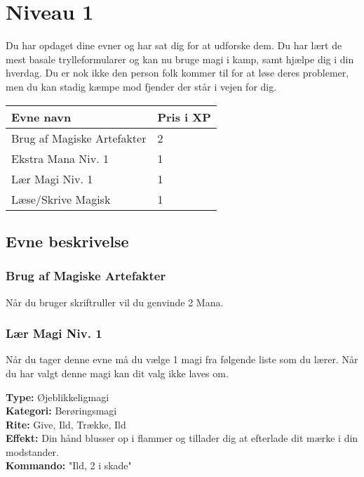 \chapter{Niveau 1}
Du har opdaget dine evner og har sat dig for at udforske dem. Du har lært de mest basale trylleformularer og kan nu bruge magi i kamp, samt hjælpe dig i din hverdag. Du er nok ikke den person folk kommer til for at løse deres problemer, men du kan stadig kæmpe mod fjender der står i vejen for dig.
\begin{table}[H]
    \centering
    \begin{tabular}{|p{}|p{}|}
    \rowcolor{cerulean!80}\hline
        Evne navn & Pris i XP \\\hline
         Brug af Magiske Artefakter & 2 \\\hline
         Ekstra Mana Niv. 1 & 1 \\\hline
         Lær Magi Niv. 1 & 1 \\\hline
         Læse/Skrive Magisk & 1 \\\hline
    \end{tabular}
\end{table} 

\section{Evne beskrivelse}

\subsection{Brug af Magiske Artefakter}
Når du bruger skriftruller vil du genvinde 2 Mana. 



\subsection{Lær Magi Niv. 1}
Når du tager denne evne må du vælge 1 magi fra følgende liste som du lærer. Når du har valgt denne magi kan dit valg ikke laves om.

\begin{lærmagi*}[Ild]
\textbf{Type:} Øjeblikkeligmagi\\
\textbf{Kategori:} Berøringsmagi\\
\textbf{Rite:} Give, Ild, Trække, Ild\\
\textbf{Effekt:} Din hånd blusser op i flammer og tillader dig at efterlade dit mærke i din modstander.\\
\textbf{Kommando:} "Ild, 2 i skade"\\
\end{lærmagi*}

